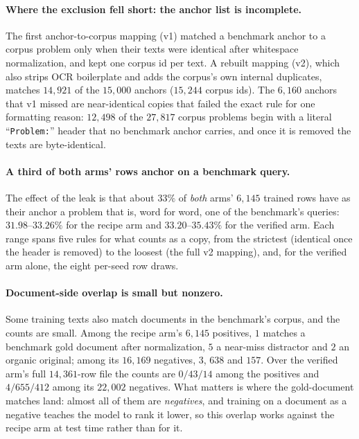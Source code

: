 \paragraph{Where the exclusion fell short: the anchor list is incomplete.}The first anchor-to-corpus mapping (v1) matched a benchmark anchor to a corpus problem only when their texts were identical after whitespace normalization, and kept one corpus id per text. A rebuilt mapping (v2), which also strips OCR boilerplate and adds the corpus's own internal duplicates, matches $14{,}921$ of the $15{,}000$ anchors ($15{,}244$ corpus ids). The $6{,}160$ anchors that v1 missed are near-identical copies that failed the exact rule for one formatting reason: $12{,}498$ of the $27{,}817$ corpus problems begin with a literal ``\texttt{Problem:}'' header that no benchmark anchor carries, and once it is removed the texts are byte-identical.


\paragraph{A third of both arms' rows anchor on a benchmark query.}The effect of the leak is that about $33\%$ of \emph{both} arms' $6{,}145$ trained rows have as their anchor a problem that is, word for word, one of the benchmark's queries: $31.98$--$33.26\%$ for the recipe arm and $33.20$--$35.43\%$ for the verified arm. Each range spans five rules for what counts as a copy, from the strictest (identical once the header is removed) to the loosest (the full v2 mapping), and, for the verified arm alone, the eight per-seed row draws.

\paragraph{Document-side overlap is small but nonzero.}Some training texts also match documents in the benchmark's corpus, and the counts are small. Among the recipe arm's $6{,}145$ positives, $1$ matches a benchmark gold document after normalization, $5$ a near-miss distractor and $2$ an organic original; among its $16{,}169$ negatives, $3$, $638$ and $157$. Over the verified arm's full $14{,}361$-row file the counts are $0/43/14$ among the positives and $4/655/412$ among its $22{,}002$ negatives. What matters is where the gold-document matches land: almost all of them are \emph{negatives}, and training on a document as a negative teaches the model to rank it lower, so this overlap works against the recipe arm at test time rather than for it.

